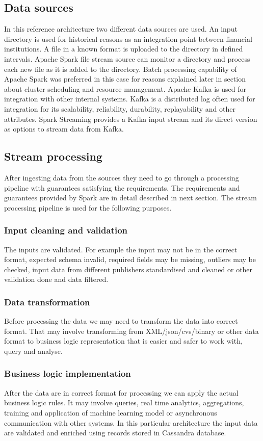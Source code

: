 \documentclass[a4paper, 10 pt, conference]{IEEEtran}
\begin{document}
\subsection{Data sources}
In this reference architecture two different data sources are used. An input directory is used for historical reasons as an integration point between financial institutions. A file in a known format is uploaded to the directory in defined intervals. Apache Spark file stream source can monitor a directory and process each new file as it is added to the directory. Batch processing capability of Apache Spark was preferred in this case for reasons explained later in section about cluster scheduling and resource management.
Apache Kafka is used for integration with other internal systems. Kafka is a distributed log often used for integration for its scalability, reliability, durability, replayability and other attributes. Spark Streaming provides a Kafka input stream and its direct version as options to stream data from Kafka.

\subsection{Stream processing}
After ingesting data from the sources they need to go through a processing pipeline with guarantees satisfying the requirements. The requirements and guarantees provided by Spark are in detail described in next section.
The stream processing pipeline is used for the following purposes.

\subsubsection{Input cleaning and validation}
The inputs are validated. For example the input may not be in the correct format, expected schema invalid, required fields may be missing, outliers may be checked, input data from different publishers standardised and cleaned or other validation done and data filtered.

\subsubsection{Data transformation}
Before processing the data we may need to transform the data into correct format. That may involve transforming from XML/json/cvs/binary or other data format to business logic representation that is easier and safer to work with, query and analyse.

\subsubsection{Business logic implementation}
After the data are in correct format for processing we can apply the actual business logic rules. It may involve queries, real time analytics, aggregations, training and application of machine learning model or asynchronous communication with other systems. In this particular architecture the input data are validated and enriched using records stored in Cassandra database.
\end{document}
